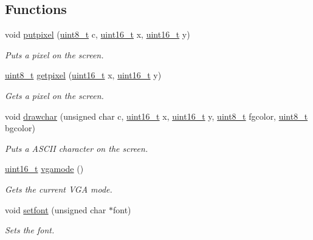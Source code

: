 \subsection*{Functions}
\begin{DoxyCompactItemize}
\item 
void \hyperlink{a00038_ab17a69b465efb1ebe54a6a2e5d7b7ce8_ab17a69b465efb1ebe54a6a2e5d7b7ce8}{putpixel} (\hyperlink{a00104_aba7bc1797add20fe3efdf37ced1182c5_aba7bc1797add20fe3efdf37ced1182c5}{uint8\+\_\+t} c, \hyperlink{a00104_a273cf69d639a59973b6019625df33e30_a273cf69d639a59973b6019625df33e30}{uint16\+\_\+t} x, \hyperlink{a00104_a273cf69d639a59973b6019625df33e30_a273cf69d639a59973b6019625df33e30}{uint16\+\_\+t} y)
\begin{DoxyCompactList}\small\item\em Puts a pixel on the screen. \end{DoxyCompactList}\item 
\hyperlink{a00104_aba7bc1797add20fe3efdf37ced1182c5_aba7bc1797add20fe3efdf37ced1182c5}{uint8\+\_\+t} \hyperlink{a00038_aac0685da0bbf1115c2b76b0aedf7e1f0_aac0685da0bbf1115c2b76b0aedf7e1f0}{getpixel} (\hyperlink{a00104_a273cf69d639a59973b6019625df33e30_a273cf69d639a59973b6019625df33e30}{uint16\+\_\+t} x, \hyperlink{a00104_a273cf69d639a59973b6019625df33e30_a273cf69d639a59973b6019625df33e30}{uint16\+\_\+t} y)
\begin{DoxyCompactList}\small\item\em Gets a pixel on the screen. \end{DoxyCompactList}\item 
void \hyperlink{a00038_a2c8df7a20b47341b70d97a7ff21d86ea_a2c8df7a20b47341b70d97a7ff21d86ea}{drawchar} (unsigned char c, \hyperlink{a00104_a273cf69d639a59973b6019625df33e30_a273cf69d639a59973b6019625df33e30}{uint16\+\_\+t} x, \hyperlink{a00104_a273cf69d639a59973b6019625df33e30_a273cf69d639a59973b6019625df33e30}{uint16\+\_\+t} y, \hyperlink{a00104_aba7bc1797add20fe3efdf37ced1182c5_aba7bc1797add20fe3efdf37ced1182c5}{uint8\+\_\+t} fgcolor, \hyperlink{a00104_aba7bc1797add20fe3efdf37ced1182c5_aba7bc1797add20fe3efdf37ced1182c5}{uint8\+\_\+t} bgcolor)
\begin{DoxyCompactList}\small\item\em Puts a A\+S\+C\+II character on the screen. \end{DoxyCompactList}\item 
\hyperlink{a00104_a273cf69d639a59973b6019625df33e30_a273cf69d639a59973b6019625df33e30}{uint16\+\_\+t} \hyperlink{a00038_af6d170c9401ea8f94d4c5cf09347cca7_af6d170c9401ea8f94d4c5cf09347cca7}{vgamode} ()
\begin{DoxyCompactList}\small\item\em Gets the current V\+GA mode. \end{DoxyCompactList}\item 
void \hyperlink{a00038_abb01dc16ea34f0a6de3d10d732b6c536_abb01dc16ea34f0a6de3d10d732b6c536}{setfont} (unsigned char $\ast$font)
\begin{DoxyCompactList}\small\item\em Sets the font. \end{DoxyCompactList}\end{DoxyCompactItemize}


